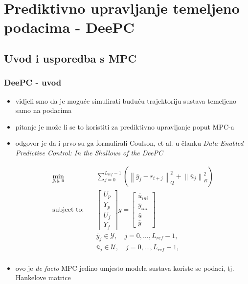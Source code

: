 \documentclass[10pt]{beamer}
\newcommand{\norm}[1]{\left\lVert #1 \right\rVert}
\begin{document}
\section{Prediktivno upravljanje temeljeno podacima - DeePC}
\subsection{Uvod i usporedba s MPC}
\begin{frame}
    \frametitle{DeePC - uvod}
    \begin{itemize}
        \item vidjeli smo da je moguće simulirati buduću trajektoriju sustava temeljeno samo na podacima
        \item pitanje je može li se to koristiti za prediktivno upravljanje poput MPC-a
        \item odgovor je da i prvo su ga formulirali Coulson, et al. u članku \textit{Data-Enabled Predictive Control: In the Shallows of the DeePC}
        
        \begin{equation}
            \begin{aligned}
                \min_{g,y,u} \quad  &\sum_{j=0}^{L_{ref}-1} \left(\norm{\bar{y}_j - r_{t+j}}^{2}_{Q} + \norm{\bar{u}_j}^{2}_{R}\right) \\
                \text{subject to:} \quad & \begin{bmatrix} U_p \\ Y_p \\ U_f \\ Y_f\end{bmatrix}g = \begin{bmatrix} \bar{u}_{ini} \\ \bar{y}_{ini} \\ \bar{u} \\ \bar{y}\end{bmatrix}\\
                &\bar{y}_j \in \mathcal{Y}, \quad j=0,\dots,L_{ref}-1, \\
                &\bar{u}_j \in \mathcal{U}, \quad j=0,\dots,L_{ref}-1, \\
            \end{aligned}
            \label{eq:deepc}
        \end{equation}

        \item ovo je \textit{de facto} MPC jedino umjesto modela sustava koriste se podaci, tj. Hankelove matrice
    \end{itemize}
\end{frame}
\end{document}
